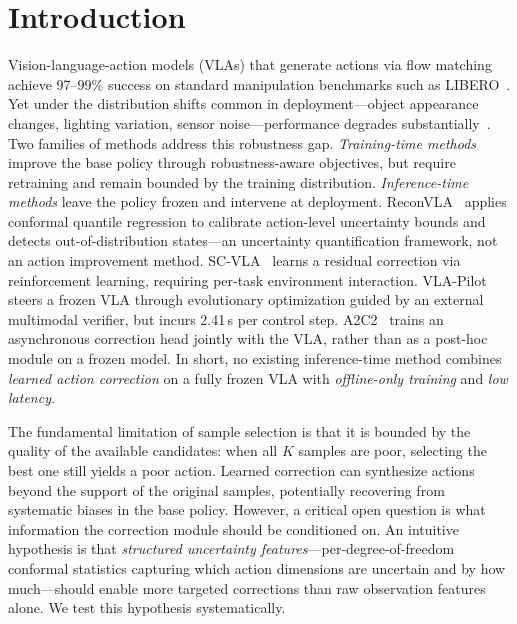 \section{Introduction}
\label{sec:intro}

Vision-language-action models (VLAs) that generate actions via flow matching~\cite{black2024pi0,shukor2025smolvla} achieve 97--99\% success on standard manipulation benchmarks such as LIBERO~\cite{liu2023libero}.
Yet under the distribution shifts common in deployment---object appearance changes, lighting variation, sensor noise---performance degrades substantially~\cite{fei2025liberoplus}.
Two families of methods address this robustness gap.
\emph{Training-time methods}~\cite{robustvla2025,srpo2025,digflow2025} improve the base policy through robustness-aware objectives, but require retraining and remain bounded by the training distribution.
\emph{Inference-time methods} leave the policy frozen and intervene at deployment.
ReconVLA~\cite{chen2026reconvla} applies conformal quantile regression to calibrate action-level uncertainty bounds and detects out-of-distribution states---an uncertainty quantification framework, not an action improvement method.
SC-VLA~\cite{sc_vla_2026} learns a residual correction via reinforcement learning, requiring per-task environment interaction.
VLA-Pilot~\cite{vla_pilot_2025} steers a frozen VLA through evolutionary optimization guided by an external multimodal verifier, but incurs 2.41\,s per control step.
A2C2~\cite{a2c2_2025} trains an asynchronous correction head jointly with the VLA, rather than as a post-hoc module on a frozen model.
In short, no existing inference-time method combines \emph{learned action correction} on a fully frozen VLA with \emph{offline-only training} and \emph{low latency}.

The fundamental limitation of sample selection is that it is bounded by the quality of the available candidates: when all $K$ samples are poor, selecting the best one still yields a poor action.
Learned correction can synthesize actions beyond the support of the original samples, potentially recovering from systematic biases in the base policy.
However, a critical open question is what information the correction module should be conditioned on.
An intuitive hypothesis is that \emph{structured uncertainty features}---per-degree-of-freedom conformal statistics capturing which action dimensions are uncertain and by how much---should enable more targeted corrections than raw observation features alone.
We test this hypothesis systematically.


